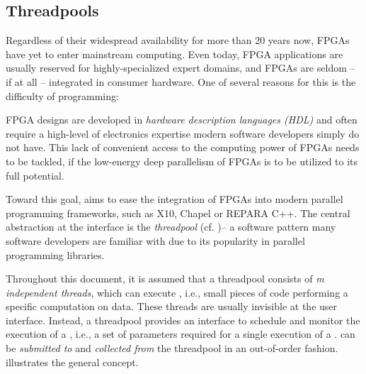 \subsection*{Threadpools}
Regardless of their widespread availability for more than 20 years now, FPGAs have yet to enter mainstream computing.
Even today, FPGA applications are usually reserved for highly-specialized expert domains, and FPGAs are seldom -- if at all -- integrated in consumer hardware.
One of several reasons for this is the difficulty of programming:

FPGA designs are developed in \emph{hardware description languages (HDL)} and often require a high-level of electronics expertise modern software developers simply do not have.
This lack of convenient access to the computing power of FPGAs needs to be tackled, if the low-energy deep parallelism of FPGAs is to be utilized to its full potential.

\medskip
Toward this goal, \tpc{} aims to ease the integration of FPGAs into modern parallel programming frameworks, such as X10, Chapel or REPARA C++.
The central abstraction at the interface is the \emph{threadpool} (cf. \cite{threadpool})-- a software pattern many software developers are familiar with due to its popularity in parallel programming libraries.

Throughout this document, it is assumed that a threadpool consists of \emph{m independent threads}, which can execute , i.e., small pieces of code performing a specific computation on data.
These threads are usually invisible at the user interface.
Instead, a threadpool provides an interface to schedule and monitor the execution of a , i.e., a set of parameters required for a single execution of a .
 can be \emph{submitted to} and \emph{collected from} the threadpool in an out-of-order fashion.
 illustrates the general concept.


